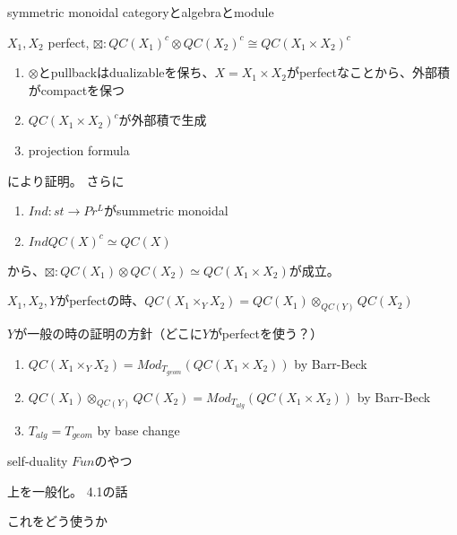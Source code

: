 \documentclass[dvipdfmx]{beamer}
\begin{document}
\begin{frame}
symmetric monoidal categoryとalgebraとmodule
\end{frame}

\begin{frame}
\begin{prop}
$X_1, X_2$ perfect, $\boxtimes:QC(X_1)^c\otimes QC(X_2)^c \cong QC(X_1\times X_2)^c$
\end{prop}
\begin{enumerate}
\item $\otimes$とpullbackはdualizableを保ち、$X=X_1\times X_2$がperfectなことから、外部積がcompactを保つ
\item $QC(X_1\times X_2)^c$が外部積で生成
\item projection formula
\end{enumerate}
により証明。
さらに
\begin{enumerate}
\item $Ind:st \to Pr^L$がsummetric monoidal
\item $IndQC(X)^c\simeq QC(X)$
\end{enumerate}
から、$\boxtimes:QC(X_1)\otimes QC(X_2) \simeq QC(X_1\times X_2)$が成立。
\end{frame}

\begin{frame}
\begin{thm}[BFNのTheorem 4.7]
$X_1, X_2, Y$がperfectの時、$QC(X_1 \times_Y X_2) = QC(X_1) \otimes_{QC(Y)}QC(X_2)$
\end{thm}

$Y$が一般の時の証明の方針（どこに$Y$がperfectを使う？）
\begin{enumerate}
\item $QC(X_1\times_YX_2)=Mod_{T_{geom}}(QC(X_1\times X_2))$ by Barr-Beck
\item $QC(X_1)\otimes_{QC(Y)}QC(X_2)=Mod_{T_{alg}}(QC(X_1\times X_2))$ by Barr-Beck
\item $T_{alg}=T_{geom}$ by base change
\end{enumerate}
\end{frame}

\begin{frame}
self-duality
$Fun$のやつ
\end{frame}

\begin{frame}
上を一般化。
4.1の話

これをどう使うか
\end{frame}
\end{document}
